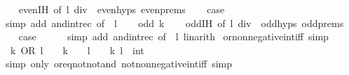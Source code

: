 \begin{isabellebody}
\ \ \isamarkupfalse%
\ even{\isachardot}{\kern0pt}IH\ {\isacharbrackleft}{\kern0pt}of\ {\isacartoucheopen}l\ div\ {}{\isacartoucheclose}{\isacharbrackright}{\kern0pt}\ even{\isachardot}{\kern0pt}hyps\ even{\isachardot}{\kern0pt}prems\isanewline
\ \ \isamarkupfalse%
\ {\isacharquery}{\kern0pt}case\isanewline
\ \ \ \ \isamarkupfalse%
\ {\isacharparenleft}{\kern0pt}simp\ add{\isacharcolon}{\kern0pt}\ and{\isacharunderscore}{\kern0pt}int{\isacharunderscore}{\kern0pt}rec\ {\isacharbrackleft}{\kern0pt}of\ {\isacharunderscore}{\kern0pt}\ l{\isacharbrackright}{\kern0pt}{\isacharparenright}{\kern0pt}\isanewline
{}\isamarkupfalse%
\isanewline
\ \ \isamarkupfalse%
\ {\isacharparenleft}{\kern0pt}odd\ k{\isacharparenright}{\kern0pt}\isanewline
\ \ \isamarkupfalse%
\ odd{\isachardot}{\kern0pt}IH\ {\isacharbrackleft}{\kern0pt}of\ {\isacartoucheopen}l\ div\ {}{\isacartoucheclose}{\isacharbrackright}{\kern0pt}\ odd{\isachardot}{\kern0pt}hyps\ odd{\isachardot}{\kern0pt}prems\isanewline
\ \ \isamarkupfalse%
\ {\isacharquery}{\kern0pt}case\isanewline
\ \ \ \ \isamarkupfalse%
\ {\isacharparenleft}{\kern0pt}simp\ add{\isacharcolon}{\kern0pt}\ and{\isacharunderscore}{\kern0pt}int{\isacharunderscore}{\kern0pt}rec\ {\isacharbrackleft}{\kern0pt}of\ {\isacharunderscore}{\kern0pt}\ l{\isacharbrackright}{\kern0pt}{\isacharparenright}{\kern0pt}\ linarith\isanewline
{}\isamarkupfalse%
%
\endisatagproof
{\isafoldproof}%
%
\isadelimproof
\isanewline
%
\endisadelimproof
\isanewline
{}\isamarkupfalse%
\ or{\isacharunderscore}{\kern0pt}nonnegative{\isacharunderscore}{\kern0pt}int{\isacharunderscore}{\kern0pt}iff\ {\isacharbrackleft}{\kern0pt}simp{\isacharbrackright}{\kern0pt}{\isacharcolon}{\kern0pt}\isanewline
\ \ {\isacartoucheopen}k\ OR\ l\ {\isasymge}\ {}\ {\isasymlongleftrightarrow}\ k\ {\isasymge}\ {}\ {\isasymand}\ l\ {\isasymge}\ {}{\isacartoucheclose}\ \ k\ l\ {\isacharcolon}{\kern0pt}{\isacharcolon}{\kern0pt}\ int\isanewline
%
\isadelimproof
\ \ %
\endisadelimproof
%
\isatagproof
{}\isamarkupfalse%
\ {\isacharparenleft}{\kern0pt}simp\ only{\isacharcolon}{\kern0pt}\ or{\isacharunderscore}{\kern0pt}eq{\isacharunderscore}{\kern0pt}not{\isacharunderscore}{\kern0pt}not{\isacharunderscore}{\kern0pt}and\ not{\isacharunderscore}{\kern0pt}nonnegative{\isacharunderscore}{\kern0pt}int{\isacharunderscore}{\kern0pt}iff{\isacharparenright}{\kern0pt}\ simp%

\end{isabellebody}
